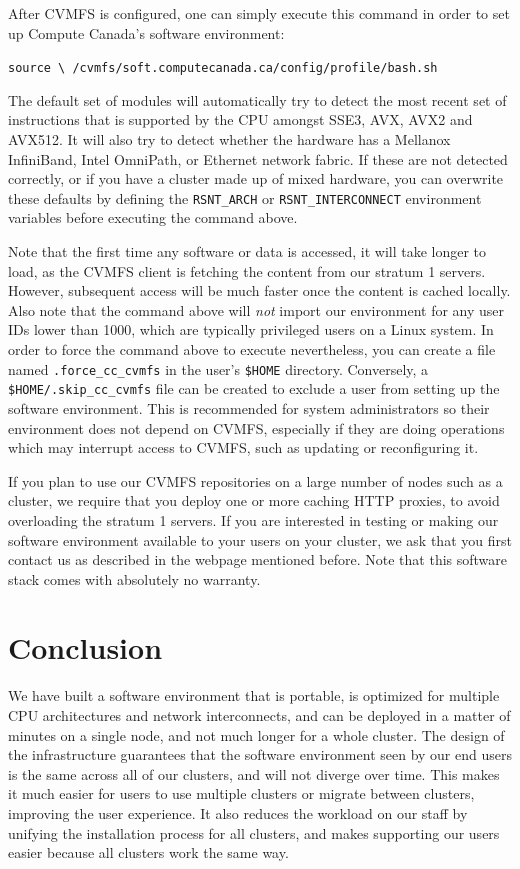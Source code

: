 \documentclass[sigconf]{acmart}
\begin{document}
After CVMFS is configured, one can simply execute this command in order to set up Compute Canada's software environment: 

\begin{center}
\texttt{source \textbackslash \linebreak
/cvmfs/soft.computecanada.ca/config/profile/bash.sh}
\end{center}

The default set of modules will automatically try to detect the most recent set of instructions that is supported by the CPU amongst  SSE3, AVX, AVX2 and AVX512. It will also try to detect whether the hardware has a Mellanox InfiniBand, Intel OmniPath, or Ethernet network fabric. If these are not detected correctly, or if you have a cluster made up of mixed hardware, you can overwrite these defaults by defining the \texttt{RSNT\_ARCH} or \texttt{RSNT\_INTERCONNECT} environment variables before executing the command above. 

Note that the first time any software or data is accessed, it will take longer to load, as the CVMFS client is fetching the content from our stratum 1 servers. However, subsequent access will be much faster once the content is cached locally. 
Also note that the command above will {\it not} import our environment for any user IDs lower than 1000, which are typically privileged users on a Linux system. In order to force the command above to execute nevertheless, you can create a file named \texttt{.force\_cc\_cvmfs} in the user's \texttt{\$HOME} directory. Conversely, a \texttt{\$HOME/.skip\_cc\_cvmfs} file can be created to exclude a user from setting up the software environment. This is recommended for system administrators so their environment does not depend on CVMFS, especially if they are doing operations which may interrupt access to CVMFS, such as updating or reconfiguring it.

If you plan to use our CVMFS repositories on a large number of nodes such as a cluster, we require that you deploy one or more caching HTTP proxies, to avoid overloading the stratum 1 servers. If you are interested in testing or making our software environment available to your users on your cluster, we ask that you first contact us as described in the webpage mentioned before. Note that this software stack comes with absolutely no warranty. 

\section{Conclusion}
\label{sec:Conclusion}
We have built a software environment that is portable, is optimized for multiple CPU architectures and network interconnects, and can be deployed in a matter of minutes on a single node, and not much longer for a whole cluster. The design of the infrastructure guarantees that the software environment seen by our end users is the same across all of our clusters, and will not diverge over time. This makes it much easier for users to use multiple clusters or migrate between clusters, improving the user experience. It also reduces the workload on our staff by unifying the installation process for all clusters, and makes supporting our users easier because all clusters work the same way.
\end{document}
